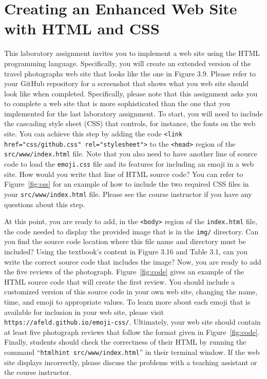 \documentclass[11pt]{article}
\newcommand{\mainprogram}{\lstinline{index.html}}
\newcommand{\mainprogramsource}{\lstinline{src/www/index.html}}
\newcommand{\command}[1]{``\lstinline{#1}''}
\newcommand{\program}[1]{\lstinline{#1}}
\newcommand{\url}[1]{\lstinline{#1}}
\begin{document}
\section*{Creating an Enhanced Web Site with HTML and CSS}

This laboratory assignment invites you to implement a web site using the HTML
programming language. Specifically, you will create an extended version of the
travel photographs web site that looks like the one in Figure 3.9. Please refer
to your GitHub repository for a screenshot that shows what you web site should
look like when completed. Specifically, please note that this assignment asks
you to complete a web site that is more sophisticated than the one that you
implemented for the last laboratory assignment. To start, you will need to
include the cascading style sheet (CSS) that controls, for instance, the fonts
on the web site. You can achieve this step by adding the code \program{<link
href="css/github.css" rel="stylesheet">} to the \program{<head>} region of the
\mainprogramsource{} file. Note that you also need to have another line of
source code to load the \program{emoji.css} file and its features for including
an emoji in a web site. How would you write that line of HTML source code? You
can refer to Figure~\ref{fig:css} for an example of how to include the two
required CSS files in your \mainprogramsource{} file. Please see the course
instructor if you have any questions about this step.

At this point, you are ready to add, in the \program{<body>} region of the
\mainprogram{} file, the code needed to display the provided image that is in
the \program{img/} directory. Can you find the source code location where this
file name and directory must be included? Using the textbook's content in Figure
3.16 and Table 3.1, can you write the correct source code that includes the
image? Now, you are ready to add the five reviews of the photograph.
Figure~\ref{fig:code} gives an example of the HTML source code that will create
the first review. You should include a customized version of this source code in
your own web site, changing the name, time, and emoji to appropriate values. To
learn more about each emoji that is available for inclusion in your web site,
please visit \url{https://afeld.github.io/emoji-css/}. Ultimately, your web site
should contain at least five photograph reviews that follow the format given in
Figure~\ref{fig:code}. Finally, students should check the correctness of their
HTML by running the command \command{htmlhint src/www/index.html} in their
terminal window. If the web site displays incorrectly, please discuss the
problems with a teaching assistant or the course instructor.
\end{document}
